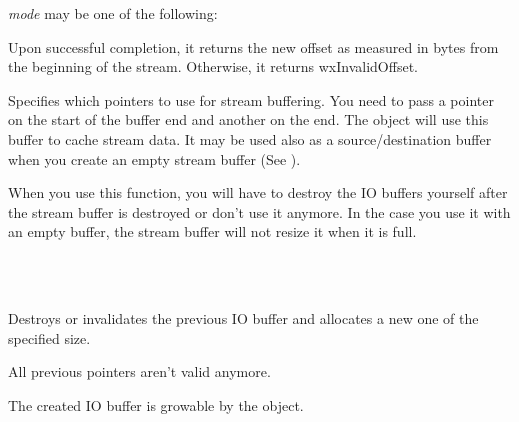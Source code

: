 {\it mode} may be one of the following:

\twocolwidtha{5cm}
\begin{twocollist}\itemsep=0pt
\end{twocollist}


Upon successful completion, it returns the new offset as measured in bytes from
the beginning of the stream. Otherwise, it returns wxInvalidOffset.


\label{wxstreambuffersetbufferio}


Specifies which pointers to use for stream buffering. You need to pass a pointer on the
start of the buffer end and another on the end. The object will use this buffer
to cache stream data. It may be used also as a source/destination buffer when
you create an empty stream buffer (See ).


When you use this function, you will have to destroy the IO buffers yourself
after the stream buffer is destroyed or don't use it anymore.
In the case you use it with an empty buffer, the stream buffer will not resize
it when it is full.


\\
\\


Destroys or invalidates the previous IO buffer and allocates a new one of the
specified size.


All previous pointers aren't valid anymore.


The created IO buffer is growable by the object.

